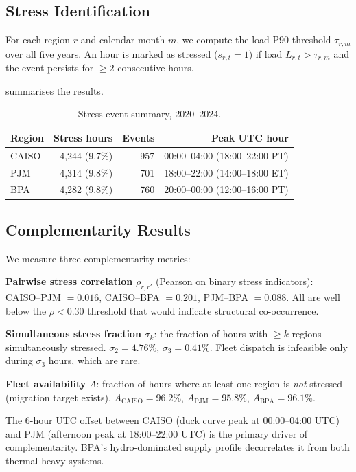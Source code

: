 \documentclass[sigplan,10pt,review]{acmart}
\begin{document}
\subsection{Stress Identification}

For each region $r$ and calendar month $m$, we compute the load P90 threshold
$\tau_{r,m}$ over all five years.  An hour is marked as stressed
($s_{r,t} = 1$) if load $L_{r,t} > \tau_{r,m}$ and the event persists for
$\geq 2$ consecutive hours.

 summarises the results.

\begin{table}[h]
\centering
\caption{Stress event summary, 2020--2024.}
\label{tab:stress_summary}
\begin{tabular}{lrrr}
\toprule
Region & Stress hours & Events & Peak UTC hour \\
\midrule
CAISO  & 4,244 (9.7\%)  & 957 & 00:00--04:00 (18:00--22:00 PT) \\
PJM    & 4,314 (9.8\%)  & 701 & 18:00--22:00 (14:00--18:00 ET) \\
BPA    & 4,282 (9.8\%)  & 760 & 20:00--00:00 (12:00--16:00 PT) \\
\bottomrule
\end{tabular}
\end{table}

\subsection{Complementarity Results}

We measure three complementarity metrics:

\textbf{Pairwise stress correlation} $\rho_{r,r'}$ (Pearson on binary stress
indicators): CAISO--PJM $= 0.016$, CAISO--BPA $= 0.201$, PJM--BPA $= 0.088$.
All are well below the $\rho < 0.30$ threshold that would indicate structural
co-occurrence.

\textbf{Simultaneous stress fraction} $\sigma_k$: the fraction of hours with
$\geq k$ regions simultaneously stressed.  $\sigma_2 = 4.76\%$,
$\sigma_3 = 0.41\%$.  Fleet dispatch is infeasible only during $\sigma_3$
hours, which are rare.

\textbf{Fleet availability} $A$: fraction of hours where at least one region
is \emph{not} stressed (migration target exists).  $A_{\text{CAISO}} = 96.2\%$,
$A_{\text{PJM}} = 95.8\%$, $A_{\text{BPA}} = 96.1\%$.

The 6-hour UTC offset between CAISO (duck curve peak at 00:00--04:00 UTC) and
PJM (afternoon peak at 18:00--22:00 UTC) is the primary driver of
complementarity.  BPA's hydro-dominated supply profile decorrelates it from
both thermal-heavy systems.
\end{document}

